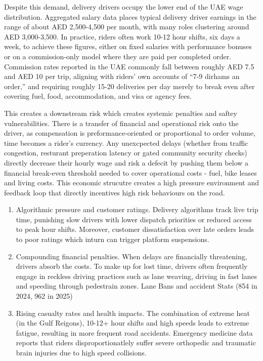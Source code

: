\documentclass[11pt]{article}
\begin{document}
Despite this demand, delivery drivers occupy the lower end of the UAE wage distribution. Aggregated salary data places typical delivery driver earnings in the range of about AED 2,500-4,500 per month, with many roles clustering around AED 3,000-3,500. In practice, riders often work 10-12 hour shifts, six days a week, to achieve these figures, either on fixed salaries with performance bonuses or on a commission-only model where they are paid per completed order. Commission rates reported in the UAE commonly fall between roughly AED 7.5 and AED 10 per trip, aligning with riders' own accounts of “7-9 dirhams an order,” and requiring roughly 15-20 deliveries per day merely to break even after covering fuel, food, accommodation, and visa or agency fees.\cite{indeed_delivery_driver_dubai}

This creates a downstream risk which creates systemic penalties and saftey vulnerabilities. There is a transfer of financial and operational risk onto the driver, as compensation is preformance-oriented or proportional to order volume, time becomes a rider's currency. Any unexcpected delays (whether from traffic congestion, resturant preperation latency or gated community security checks) directly decrease their hourly wage and risk a defecit by pushing them below a financial break-even threshold needed to cover operational costs - fuel, bike leases and living costs. This economic strucutre creates a high pressure environment and feedback loop that directly incentives high risk behaviours on the road. \cite{roadsafetyuae_gig_pay_2024}

\begin{enumerate}
  \item Algorithmic pressure and customer ratings.
  Delivery algorithms track live trip time, punishing slow drivers with lower dispatch priorities or reduced access to peak hour shifts. Moreover, customer dissatisfaction over late orders leads to poor ratings which inturn can trigger platform suspensions. \cite{jpost_medialine_gig_investigation_2024}
  \item Compounding financial penalties. 
  When delays are financially threatening, drivers absorb the costs. To make up for lost time, drivers often frequently engage in reckless driving practices such as lane weaving, driving in fast lanes and speeding through pedestrain zones. Lane Bans and accident Stats (854 in 2024, 962 in 2025) \cite{dubai_police_rta_2025}
  \item Rising casualty rates and health impacts. 
  The combination of extreme heat (in the Gulf Reigons), 10-12+ hour shifts and high speeds leads to extreme fatigue, resulting in more frequent road accidents. Emergency medicine data reports that riders disproportionatlely suffer severe orthopedic and traumatic brain injuries due to high speed collisions. \cite{media_line_sgh_2025}
\end{enumerate}
\end{document}
